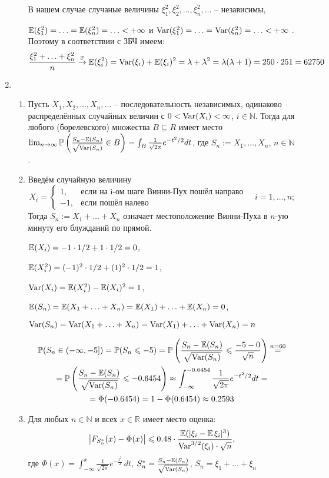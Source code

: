 \begin{enumerate}
\begin{enumerate}
В нашем случае случаные величины $\xi_1^2, \xi_2^2, \ldots, \xi_n^2, \ldots$ – независимы,

$\operatorname{\mathbb{E}}(\xi_1^2) = \ldots = \operatorname{\mathbb{E}}(\xi_n^2) = \ldots < + \infty$ и $\operatorname{Var}(\xi_1^2) = \ldots = \operatorname{Var}(\xi_n^2) = \ldots < + \infty$ . Поэтому в соответствии с ЗБЧ имеем:
\[
\frac{\xi_1^2 +\ldots+ \xi_n^2}{n} \stackrel{\operatorname{\mathbb{P}}}{\to} \operatorname{\mathbb{E}}(\xi_i^2) = \operatorname{Var}(\xi_i) +\operatorname{\mathbb{E}}(\xi_i)^2 = \lambda + \lambda^2 = \lambda(\lambda+1) = 250\cdot251 = 62750
\]
\end{enumerate}

\item \begin{enumerate}
\item Пусть $X_1, X_2, \ldots, X_n, \ldots$ – последовательность независимых, одинаково распределённых случайных величин с $0<\operatorname{Var}(X_i)<\infty$, $i \in \mathbb{N}$.  Тогда для любого (борелевского) множества $B \subseteq R$ имеет место $\lim_{n \to \infty} \operatorname{\mathbb{P}}\left(\frac{S_n - \operatorname{\mathbb{E}}(S_n)}{\sqrt{\operatorname{Var}(S_n)}} \in B\right) = \int_B \frac{1}{\sqrt{2\pi}}e^{-t^2/2} dt$, где $S_n := X_1, \ldots, X_n$, $n \in \mathbb{N}$.
\item Введём случайную величину
\[
X_i = \begin{cases}
1, & \text{если на i-ом шаге Винни-Пух пошёл направо} \\
-1, & \text{если пошёл налево}
\end{cases}
\quad i=1,\ldots, n;
\]
Тогда $S_n := X_1 +\ldots+X_n$ означает местоположение Винни-Пуха в $n$-ую минуту его блужданий по прямой.

$\operatorname{\mathbb{E}}(X_i) = -1 \cdot 1/2 + 1 \cdot 1/2 = 0$,

$\operatorname{\mathbb{E}}(X_i^2) = (-1)^2 \cdot 1/2 + (1)^2 \cdot 1/2 = 1$,

$\operatorname{Var}(X_i) = \operatorname{\mathbb{E}}(X_i^2) - \operatorname{\mathbb{E}}(X_i)^2 = 1$,

$\operatorname{\mathbb{E}}(S_n) = \operatorname{\mathbb{E}}(X_1 + \ldots + X_n ) = \operatorname{\mathbb{E}}(X_1) + \ldots + \operatorname{\mathbb{E}}(X_n) = 0$,

$\operatorname{Var}(S_n) = \operatorname{Var}(X_1 + \ldots + X_n ) = \operatorname{Var}(X_1) + \ldots + \operatorname{Var}(X_n) = n$

\begin{multline*}
\operatorname{\mathbb{P}}(S_n \in (-\infty, -5]) = \operatorname{\mathbb{P}}(S_n \leqslant -5) = \operatorname{\mathbb{P}}\left( \frac{S_n-\operatorname{\mathbb{E}}(S_n)}{\sqrt{\operatorname{Var}(S_n)}} \leqslant \frac{-5-0}{\sqrt{n}} \right) \stackrel{n=60}{=} \\
=\operatorname{\mathbb{P}}\left( \frac{S_n-\operatorname{\mathbb{E}}(S_n)}{\sqrt{\operatorname{Var}(S_n)}} \leqslant -0.6454\right) \approx \int_{-\infty}^{-0.6454} \frac{1}{\sqrt{2\pi}} e^{-t^2/2} dt = \\
= \Phi(-0.6454) = 1-\Phi(0.6454) \approx0.2593
\end{multline*}
\item Для любых $n \in \mathbb{N}$ и всех $x \in \mathbb{R}$ имеет место оценка:
\[
\bigl|F_{S_n^{*}}(x) - \Phi(x)\bigr| \leqslant 0.48 \cdot \frac{\operatorname{\mathbb{E}}(|\xi_i - \operatorname{\mathbb{E}}\xi_i|^3)}{\operatorname{Var}^{3/2}(\xi_i)\cdot\sqrt{n}} \text{,}
\]
где $\Phi(x) = \int_{-\infty}^{x}\frac{1}{\sqrt{2\pi}}e^{-\frac{t^2}{2}}\,dt$, \; $S_n^* = \frac{S_n - \operatorname{\mathbb{E}}(S_n)}{\sqrt{\operatorname{Var}(S_n)}}$, \; $S_n = \xi_1 + \ldots + \xi_n$


\end{enumerate}
\end{enumerate}
